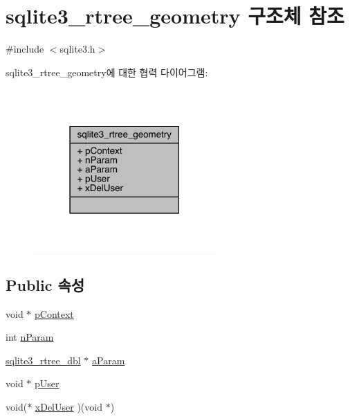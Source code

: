 \hypertarget{structsqlite3__rtree__geometry}{}\section{sqlite3\+\_\+rtree\+\_\+geometry 구조체 참조}
\label{structsqlite3__rtree__geometry}


{\ttfamily \#include $<$sqlite3.\+h$>$}



sqlite3\+\_\+rtree\+\_\+geometry에 대한 협력 다이어그램\+:
\nopagebreak
\begin{figure}[H]
\begin{center}
\leavevmode
\includegraphics[width=198pt]{structsqlite3__rtree__geometry__coll__graph}
\end{center}
\end{figure}
\subsection*{Public 속성}
\begin{DoxyCompactItemize}
\item 
void $\ast$ \hyperlink{structsqlite3__rtree__geometry_a62fe439a49ed5b8628464c418f35f572}{p\+Context}
\item 
int \hyperlink{structsqlite3__rtree__geometry_ada7b9eba82660e3321dd4c93526697c9}{n\+Param}
\item 
\hyperlink{sqlite3_8h_ae9156ff58620c1ceae9391f1afabae1b}{sqlite3\+\_\+rtree\+\_\+dbl} $\ast$ \hyperlink{structsqlite3__rtree__geometry_a0a22e4b810cb1b8f1af792fd50493002}{a\+Param}
\item 
void $\ast$ \hyperlink{structsqlite3__rtree__geometry_add62e1cd5faa6000c815104af3c540d0}{p\+User}
\item 
void($\ast$ \hyperlink{structsqlite3__rtree__geometry_ae9835a39924a75b33cce9f6b10e1813f}{x\+Del\+User} )(void $\ast$)
\end{DoxyCompactItemize}


